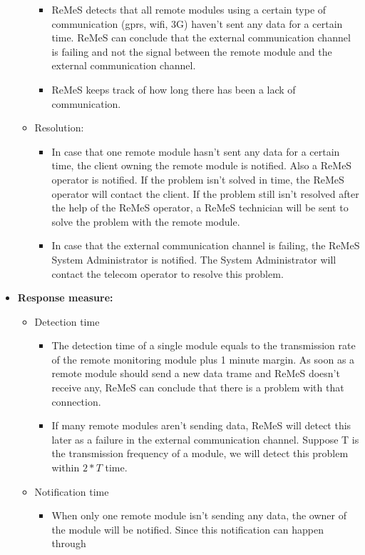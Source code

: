 \begin{itemize}
\begin{itemize}
\begin{itemize}
					\item ReMeS detects that all remote modules using a certain type of communication (gprs, wifi, 3G) haven't sent any data for a certain
							time. ReMeS can conclude that the external communication channel is failing and not the signal between the remote module and 
							the external communication channel.
					\item ReMeS keeps track of how long there has been a lack of communication.
				\end{itemize}
			\item Resolution:
				\begin{itemize}
					\item In case that one remote module hasn't sent any data for a certain time, the client owning the remote module is notified. Also a
							ReMeS operator is notified. If the problem isn't solved in time, the ReMeS operator will contact the client. If the problem still isn't
							resolved after the help of the ReMeS operator, a ReMeS technician will be sent to solve the problem with the remote module.
					\item In case that the external communication channel is failing, the ReMeS System Administrator is notified. The System Administrator will
							contact the telecom operator to resolve this problem.
				\end{itemize}
		\end{itemize}
	\item \textbf{Response measure:}
		\begin{itemize}
			\item Detection time
				\begin{itemize}
					\item The detection time of a single module equals to the transmission rate of the remote monitoring module plus 1 minute margin. As soon as a
							remote module should send a new data trame and ReMeS doesn't receive any, ReMeS can conclude that there is a problem with that connection.
					\item If many remote modules aren't sending data, ReMeS will detect this later as a failure in the external communication channel. Suppose T is the transmission frequency of a module,
							we will detect this problem within $2*T$ time.
				\end{itemize}					
			\item Notification time
				\begin{itemize}
					\item When only one remote module isn't sending any data, the owner of the module will be notified. Since this notification can happen through

\end{itemize}
\end{itemize}
\end{itemize}
